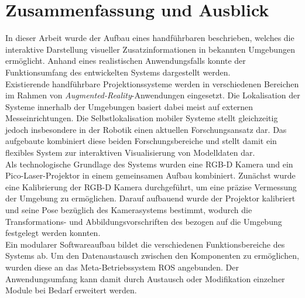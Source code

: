 \chapter{Zusammenfassung und Ausblick}
\label{chap.zusammenfassung}

In dieser Arbeit wurde der Aufbau eines handführbaren \kps{} beschrieben, welches die interaktive Darstellung visueller Zusatzinformationen in bekannten Umgebungen ermöglicht. Anhand eines realistischen Anwendungsfalls konnte der Funktionsumfang des entwickelten Systems dargestellt werden.\\

Existierende handführbare Projektionssysteme werden in verschiedenen Bereichen im Rahmen von \textit{Augmented-Reality}-Anwendungen eingesetzt. Die Lokalisation der Systeme innerhalb der Umgebungen basiert dabei meist auf externen Messeinrichtungen. Die Selbstlokalisation mobiler Systeme stellt gleichzeitig jedoch insbesondere in der Robotik einen aktuellen Forschungsansatz dar. Das aufgebaute \kps{} kombiniert diese beiden Forschungsbereiche und stellt damit ein flexibles System zur interaktiven Visualisierung von Modelldaten dar.\\

Als technologische Grundlage des Systems wurden eine RGB-D Kamera und ein Pico-Laser-Projektor in einem gemeinsamen Aufbau kombiniert. Zunächst wurde eine Kalibrierung der RGB-D Kamera durchgeführt, um eine präzise Vermessung der Umgebung zu ermöglichen. Darauf aufbauend wurde der Projektor kalibriert und seine Pose bezüglich des Kamerasystems bestimmt, wodurch die Transformations- und Abbildungsvorschriften des  bezogen auf die Umgebung festgelegt werden konnten.\\

Ein modularer Softwareaufbau bildet die verschiedenen Funktionsbereiche des Systems ab. Um den Datenaustausch zwischen den Komponenten zu ermöglichen, wurden diese an das Meta-Betriebssystem ROS angebunden. Der Anwendungsumfang kann damit durch Austausch oder Modifikation einzelner Module bei Bedarf erweitert werden.\\

